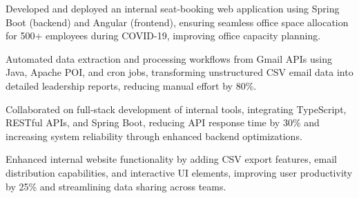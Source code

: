 \vspace{4pt}
\begin{tightemize}
    \item Developed and deployed an internal seat-booking web application using Spring Boot (backend) and Angular (frontend), ensuring seamless office space allocation for 500+ employees during COVID-19, improving office capacity planning.
    \item Automated data extraction and processing workflows from Gmail APIs using Java, Apache POI, and cron jobs, transforming unstructured CSV email data into detailed leadership reports, reducing manual effort by 80\%.
    \item Collaborated on full-stack development of internal tools, integrating TypeScript, RESTful APIs, and Spring Boot, reducing API response time by 30\% and increasing system reliability through enhanced backend optimizations.
    \item Enhanced internal website functionality by adding CSV export features, email distribution capabilities, and interactive UI elements, improving user productivity by 25\% and streamlining data sharing across teams.
\end{tightemize}
